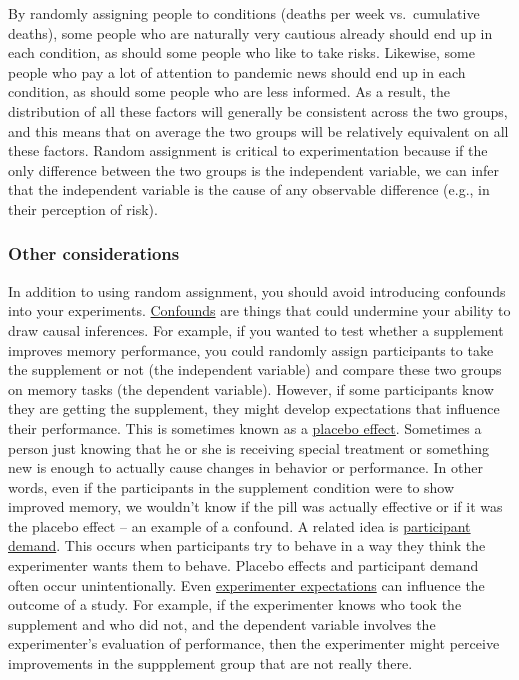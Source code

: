 \documentclass[
]{krantz}
\begin{document}
By randomly assigning people to conditions (deaths per week vs.~cumulative deaths), some people who are naturally very cautious already should end up in each condition, as should some people who like to take risks. Likewise, some people who pay a lot of attention to pandemic news should end up in each condition, as should some people who are less informed. As a result, the distribution of all these factors will generally be consistent across the two groups, and this means that on average the two groups will be relatively equivalent on all these factors. Random assignment is critical to experimentation because if the only difference between the two groups is the independent variable, we can infer that the independent variable is the cause of any observable difference (e.g., in their perception of risk).

\subsubsection*{Other considerations}\label{other-considerations}


In addition to using random assignment, you should avoid introducing confounds into your experiments. \hyperref[confounds]{Confounds} are things that could undermine your ability to draw causal inferences. For example, if you wanted to test whether a supplement improves memory performance, you could randomly assign participants to take the supplement or not (the independent variable) and compare these two groups on memory tasks (the dependent variable). However, if some participants know they are getting the supplement, they might develop expectations that influence their performance. This is sometimes known as a \hyperref[placebo-effect]{placebo effect}. Sometimes a person just knowing that he or she is receiving special treatment or something new is enough to actually cause changes in behavior or performance. In other words, even if the participants in the supplement condition were to show improved memory, we wouldn't know if the pill was actually effective or if it was the placebo effect -- an example of a confound. A related idea is \hyperref[participant-demand]{participant demand}. This occurs when participants try to behave in a way they think the experimenter wants them to behave. Placebo effects and participant demand often occur unintentionally. Even \hyperref[experimenter-expectations]{experimenter expectations} can influence the outcome of a study. For example, if the experimenter knows who took the supplement and who did not, and the dependent variable involves the experimenter's evaluation of performance, then the experimenter might perceive improvements in the suppplement group that are not really there.
\end{document}
